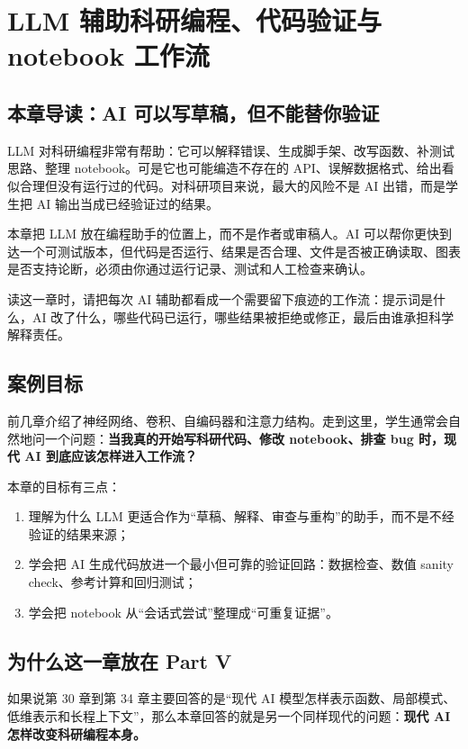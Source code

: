 \chapter{LLM 辅助科研编程、代码验证与 notebook 工作流}

\section{本章导读：AI 可以写草稿，但不能替你验证}

LLM 对科研编程非常有帮助：它可以解释错误、生成脚手架、改写函数、补测试思路、整理 notebook。可是它也可能编造不存在的 API、误解数据格式、给出看似合理但没有运行过的代码。对科研项目来说，最大的风险不是 AI 出错，而是学生把 AI 输出当成已经验证过的结果。

本章把 LLM 放在编程助手的位置上，而不是作者或审稿人。AI 可以帮你更快到达一个可测试版本，但代码是否运行、结果是否合理、文件是否被正确读取、图表是否支持论断，必须由你通过运行记录、测试和人工检查来确认。

读这一章时，请把每次 AI 辅助都看成一个需要留下痕迹的工作流：提示词是什么，AI 改了什么，哪些代码已运行，哪些结果被拒绝或修正，最后由谁承担科学解释责任。

\section{案例目标}

前几章介绍了神经网络、卷积、自编码器和注意力结构。走到这里，学生通常会自然地问一个问题：\textbf{当我真的开始写科研代码、修改 notebook、排查 bug 时，现代 AI 到底应该怎样进入工作流？}

本章的目标有三点：

\begin{enumerate}
    \item 理解为什么 LLM 更适合作为“草稿、解释、审查与重构”的助手，而不是不经验证的结果来源；
    \item 学会把 AI 生成代码放进一个最小但可靠的验证回路：数据检查、数值 sanity check、参考计算和回归测试；
    \item 学会把 notebook 从“会话式尝试”整理成“可重复证据”。
\end{enumerate}

\section{为什么这一章放在 Part V}

如果说第 30 章到第 34 章主要回答的是“现代 AI 模型怎样表示函数、局部模式、低维表示和长程上下文”，那么本章回答的就是另一个同样现代的问题：\textbf{现代 AI 怎样改变科研编程本身。}

